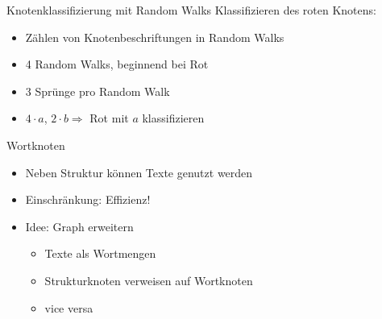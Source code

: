 \begin{frame}{Knotenklassifizierung mit Random Walks}
    Klassifizieren des roten Knotens:
    \begin{itemize}
        \item Zählen von Knotenbeschriftungen in Random Walks
        \item 4 Random Walks, beginnend bei Rot
        \item 3 Sprünge pro Random Walk
        \item<11> $4 \cdot a$, $2 \cdot b \Rightarrow$ Rot mit $a$ klassifizieren
    \end{itemize}
\end{frame}

\begin{frame}{Wortknoten}
    \begin{itemize}
        \item<1-> Neben Struktur können Texte genutzt werden
        \item<2-> Einschränkung: Effizienz!
        \item<3-> Idee: Graph erweitern
        \begin{itemize}
            \item<4-> Texte als Wortmengen
            \item<5-> Strukturknoten verweisen auf Wortknoten
            \item<6-> vice versa
        \end{itemize}
    \end{itemize}
\end{frame}

